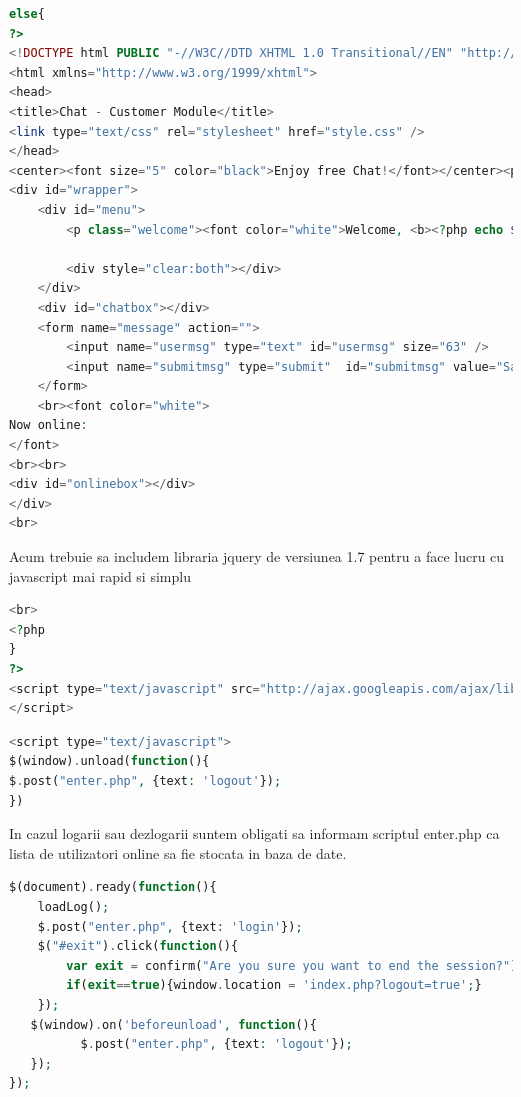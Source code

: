 \documentclass[12pt]{article}
\begin{document}
\begin{lstlisting}[language=php, caption={Fisierul index.php. Chatbox-ul}, label=list2]
else{
?>
<!DOCTYPE html PUBLIC "-//W3C//DTD XHTML 1.0 Transitional//EN" "http://www.w3.org/TR/xhtml1/DTD/xhtml1-transitional.dtd">
<html xmlns="http://www.w3.org/1999/xhtml">
<head>
<title>Chat - Customer Module</title>
<link type="text/css" rel="stylesheet" href="style.css" />
</head>
<center><font size="5" color="black">Enjoy free Chat!</font></center><p class="logout"><a id="exit" href="#"> (Exit Chat)</a><br><br>
<div id="wrapper">
    <div id="menu">
        <p class="welcome"><font color="white">Welcome, <b><?php echo $_SESSION['name']; ?></b></font></p>

        <div style="clear:both"></div>
    </div>    
    <div id="chatbox"></div>
    <form name="message" action="">
        <input name="usermsg" type="text" id="usermsg" size="63" />
        <input name="submitmsg" type="submit"  id="submitmsg" value="Say" />
    </form>
    <br><font color="white">
Now online:
</font>
<br><br>
<div id="onlinebox"></div>
</div>
<br>
\end{lstlisting}
Acum trebuie sa includem libraria jquery de versiunea 1.7 pentru a face lucru cu javascript mai rapid si simplu
\newpage
\begin{lstlisting}[language=php, caption={Fisierul index.php. Includerea librariei jquery}, label=list2]
<br>
<?php
}
?>
<script type="text/javascript" src="http://ajax.googleapis.com/ajax/libs/jquery/1.7/jquery.min.js">
</script>
\end{lstlisting}
\begin{lstlisting}[language=php, caption={Fisierul index.php. Dezlogarea la inchiderea paginii web}, label=list2]
<script type="text/javascript">
$(window).unload(function(){
$.post("enter.php", {text: 'logout'}); 
}) 
\end{lstlisting}
In cazul logarii sau dezlogarii suntem obligati sa informam scriptul enter.php ca lista de utilizatori online sa fie stocata in baza de date.
\begin{lstlisting}[language=php, caption={Fisierul index.php. On document ready}, label=list2]
$(document).ready(function(){
    loadLog();
    $.post("enter.php", {text: 'login'});  
	$("#exit").click(function(){
		var exit = confirm("Are you sure you want to end the session?");
		if(exit==true){window.location = 'index.php?logout=true';}		
	});
   $(window).on('beforeunload', function(){
          $.post("enter.php", {text: 'logout'}); 
   });
});
\end{lstlisting}
\end{document}
